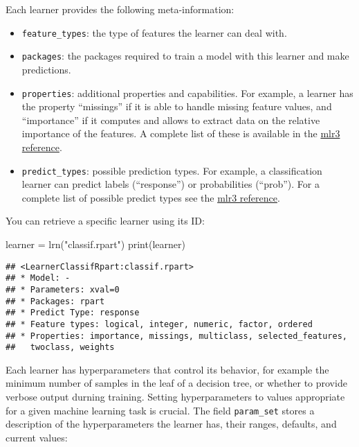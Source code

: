\documentclass[
]{scrbook}
\newenvironment{Shaded}{\begin{snugshade}}{\end{snugshade}}
\newcommand{\FunctionTok}[1]{\textcolor[rgb]{0.00,0.00,0.00}{#1}}
\newcommand{\NormalTok}[1]{#1}
\newcommand{\OtherTok}[1]{\textcolor[rgb]{0.56,0.35,0.01}{#1}}
\newcommand{\StringTok}[1]{\textcolor[rgb]{0.31,0.60,0.02}{#1}}
\providecommand{\tightlist}{%
  \setlength{\itemsep}{0pt}\setlength{\parskip}{0pt}}
\renewenvironment{Shaded} {\begin{snugshade}\small} {\end{snugshade}}
\begin{document}
Each learner provides the following meta-information:

\begin{itemize}
\tightlist
\item
  \texttt{feature\_types}: the type of features the learner can deal with.
\item
  \texttt{packages}: the packages required to train a model with this learner and make predictions.
\item
  \texttt{properties}: additional properties and capabilities.
  For example, a learner has the property ``missings'' if it is able to handle missing feature values, and ``importance'' if it computes and allows to extract data on the relative importance of the features.
  A complete list of these is available in the \href{https://mlr3.mlr-org.com/reference/mlr_reflections.html\#examples}{mlr3 reference}.
\item
  \texttt{predict\_types}: possible prediction types. For example, a classification learner can predict labels (``response'') or probabilities (``prob''). For a complete list of possible predict types see the \href{https://mlr3.mlr-org.com/reference/mlr_reflections.html\#examples}{mlr3 reference}.
\end{itemize}

You can retrieve a specific learner using its ID:

\begin{Shaded}
\begin{Highlighting}[]
\NormalTok{learner }\OtherTok{=} \FunctionTok{lrn}\NormalTok{(}\StringTok{"classif.rpart"}\NormalTok{)}
\FunctionTok{print}\NormalTok{(learner)}
\end{Highlighting}
\end{Shaded}

\begin{verbatim}
## <LearnerClassifRpart:classif.rpart>
## * Model: -
## * Parameters: xval=0
## * Packages: rpart
## * Predict Type: response
## * Feature types: logical, integer, numeric, factor, ordered
## * Properties: importance, missings, multiclass, selected_features,
##   twoclass, weights
\end{verbatim}

Each learner has hyperparameters that control its behavior, for example the minimum number of samples in the leaf of a decision tree, or whether to provide verbose output durning training.
Setting hyperparameters to values appropriate for a given machine learning task is crucial.
The field \texttt{param\_set} stores a description of the hyperparameters the learner has, their ranges, defaults, and current values:
\end{document}
